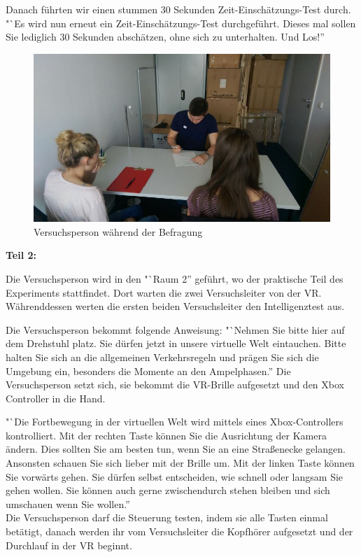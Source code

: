 \documentclass{Bericht}
\begin{document}
Danach führten wir einen stummen 30 Sekunden Zeit-Einschätzungs-Test durch. "`Es wird nun erneut ein Zeit-Einschätzungs-Test durchgeführt. Dieses mal sollen Sie lediglich 30 Sekunden abschätzen, ohne sich zu unterhalten. Und Los!''

\begin{figure}[H]
	\centering    
	\includegraphics[height=\textheight, width=\linewidth, keepaspectratio]{../Bilder/t.jpg}
	\caption{Versuchsperson während der Befragung}
	\label{img:befragung}
\end{figure}

\textbf{Teil 2:} 

Die Versuchsperson wird in den "`Raum 2'' geführt, wo der praktische Teil des Experiments stattfindet. Dort warten die zwei Versuchsleiter von der VR. Währenddessen werten die ersten beiden Versuchsleiter den Intelligenztest aus.

Die Versuchsperson bekommt folgende Anweisung: "`Nehmen Sie bitte hier auf dem Drehstuhl platz. Sie dürfen jetzt in unsere virtuelle Welt eintauchen. Bitte halten Sie sich an die allgemeinen Verkehrsregeln und prägen Sie sich die Umgebung ein, besonders die Momente an den Ampelphasen.''
Die Versuchsperson setzt sich, sie bekommt die VR-Brille aufgesetzt und den Xbox Controller in die Hand.

"`Die Fortbewegung in der virtuellen Welt wird mittels eines Xbox-Controllers kontrolliert. Mit der rechten Taste können Sie die Ausrichtung der Kamera ändern. Dies sollten Sie am besten tun, wenn Sie an eine Straßenecke gelangen. Ansonsten schauen Sie sich lieber mit der Brille um. Mit der linken Taste können Sie vorwärts gehen. Sie dürfen selbst entscheiden, wie schnell oder langsam Sie gehen wollen. Sie können auch gerne zwischendurch stehen bleiben und sich umschauen wenn Sie wollen.'' \\ 
Die Versuchsperson darf die Steuerung testen, indem sie alle Tasten einmal betätigt, danach werden ihr vom Versuchsleiter die Kopfhörer aufgesetzt und der Durchlauf in der VR beginnt. 
\end{document}
